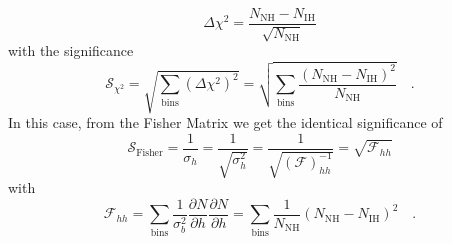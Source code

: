 \begin{equation}
 \Delta\chi^2 = \frac{N_\mathrm{NH}-N_\mathrm{IH}}{\sqrt{N_\mathrm{NH}}}
\end{equation}
with the significance
\begin{equation}
 \mathcal{S}_{\chi^2} = \sqrt{\sum_\mathrm{bins} \left(\Delta\chi^2\right)^2}
 = \sqrt{\sum_\mathrm{bins}
     \frac{(N_\mathrm{NH}-N_\mathrm{IH})^2}{N_\mathrm{NH}} }\quad.
\end{equation}
In this case, from the Fisher Matrix we get the identical significance of
\begin{equation}
 \mathcal{S}_\mathrm{Fisher} = \frac{1}{\sigma_h} = \frac{1}{\sqrt{\sigma_h^2}}
 = \frac{1}{\sqrt{(\mathcal{F})^{-1}_{hh}}}
 = \sqrt{\mathcal{F}_{hh}}
\end{equation}
with
\begin{equation}
 \mathcal{F}_{hh} = \sum_\mathrm{bins} \frac{1}{\sigma_b^2}
   \frac{\partial N}{\partial h} \frac{\partial N}{\partial h}
  = \sum_\mathrm{bins} \frac{1}{N_\mathrm{NH}}(N_\mathrm{NH}-N_\mathrm{IH})^2
  \quad.
\end{equation}

